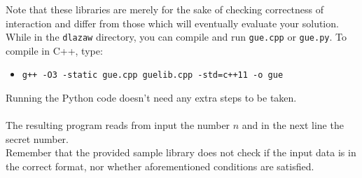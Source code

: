 \documentclass[zad,zawodnik,utf8,en]{sinol}
\begin{document}
\begin{tasktext}
    \noindent Note that these libraries are merely for the sake of checking
    correctness of interaction and differ from those which will eventually
    evaluate your solution.
    While in the \texttt{dlazaw} directory,
    you can compile and run \texttt{gue.cpp} or \texttt{gue.py}.
    To compile in C++, type:

    \begin{itemize}
        \item \texttt{g++ -O3 -static gue.cpp guelib.cpp -std=c++11 -o gue}
    \end{itemize}

    \noindent Running the Python code doesn't need any extra steps to be taken.\\
    \\
    The resulting program reads from input the number $n$
    and in the next line the secret number.
    \\
    Remember that the provided sample library does not check
    if the input data is in the correct format,
    nor whether aforementioned conditions are satisfied.

\end{tasktext}
\end{document}
